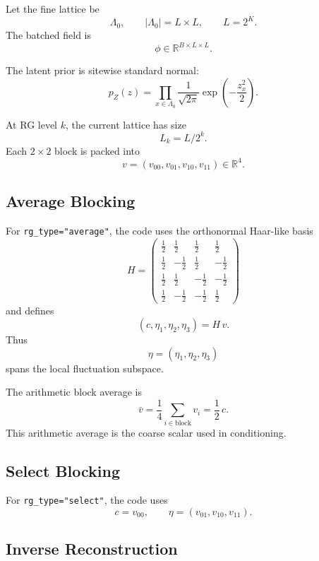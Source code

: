 \documentclass[11pt]{article}
\begin{document}
Let the fine lattice be
\[
\Lambda_0,\qquad |\Lambda_0| = L\times L,\qquad L=2^K.
\]
The batched field is
\[
\phi \in \mathbb{R}^{B\times L\times L}.
\]

The latent prior is sitewise standard normal:
\begin{equation}
p_Z(z)=\prod_{x\in\Lambda_0}\frac{1}{\sqrt{2\pi}}
\exp\!\left(-\frac{z_x^2}{2}\right).
\end{equation}

At RG level $k$, the current lattice has size
\[
L_k = L/2^k.
\]
Each $2\times 2$ block is packed into
\[
v=(v_{00},v_{01},v_{10},v_{11})\in\mathbb{R}^4.
\]

\subsection{Average Blocking}

For \texttt{rg\_type="average"}, the code uses the orthonormal Haar-like basis
\begin{equation}
H=
\begin{pmatrix}
\tfrac12 & \tfrac12 & \tfrac12 & \tfrac12 \\
\tfrac12 & -\tfrac12 & \tfrac12 & -\tfrac12 \\
\tfrac12 & \tfrac12 & -\tfrac12 & -\tfrac12 \\
\tfrac12 & -\tfrac12 & -\tfrac12 & \tfrac12
\end{pmatrix}
\end{equation}
and defines
\begin{equation}
(c,\eta_1,\eta_2,\eta_3)=H\,v.
\end{equation}
Thus
\[
\eta=(\eta_1,\eta_2,\eta_3)
\]
spans the local fluctuation subspace.

The arithmetic block average is
\[
\bar v = \frac14\sum_{i\in\mathrm{block}} v_i = \frac12\,c.
\]
This arithmetic average is the coarse scalar used in conditioning.

\subsection{Select Blocking}

For \texttt{rg\_type="select"}, the code uses
\begin{equation}
c=v_{00},\qquad \eta=(v_{01},v_{10},v_{11}).
\end{equation}

\subsection{Inverse Reconstruction}
\end{document}
